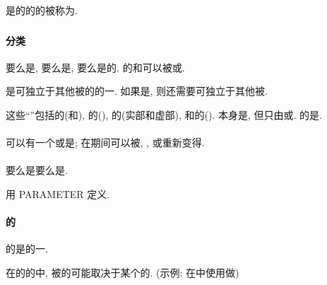 是\Function{}\Reference{}的\Execution{}的\Result{}的\Data{}\Entity{}被称为\Function{}\Result{}.

\subsubsection{\Data{}\Object{}}

\paragraph{\Data{}\Object{}分类}

\Data{}\Object{}要么是\Constant{}, 要么是\Variable{}, 要么是\Constant{}的\Subobject{}. \Named{}\Data{}\Object{}的\Type{}和\TypeParameter{}可以被\Explicitly{}或\Implicitly{}\Specify{}.

\Subobject{}是可独立于其他\Portion{}被\Reference{}的\Data{}\Object{}的一\Portion{}. 如果\Subobject{}是\Variable{}, 则还需要可独立于其他\Portion{}被\Define{}.

这些``\Portion{}''包括\Array{}的\Portion{}(\ArrayElement{}和\ArraySection{}), \CharacterString{}的\Portion{}(\Substring{}), \ComplexType{}\Object{}的\Portion{}(实部和虚部), 和\Structure{}的\Portion{}(\Component{}). \Subobject{}本身是\Data{}\Object{}, 但\Subobject{}只由\ObjectDesignator{}或\Intrinsic{}\Function{}\Reference{}. \Variable{}的\Subobject{}是\Variable{}.

\paragraph{\Variable{}}

\Variable{}可以有一个\Value{}或是\Undefined{}\Variable{}; 在\Program{}\Execution{}期间可以被\Define{}, \Redefine{}, 或重新变得\Undefined{}.

\paragraph{\Constant{}}

\Constant{}要么是\Named{}\Constant{}要么是\Literal{}\Constant{}.

\Named{}\Constant{}用 PARAMETER \Attribute{}定义.

\paragraph{\Constant{}的\Subobject{}}

\Constant{}的\Subobject{}是\Constant{}的一\Portion{}.

在\Constant{}的\Subobject{}的\ObjectDesignator{}中, 被\Reference{}的\Portion{}可能取决于某个\Variable{}的\Value{}. (示例: 在\ArraySection{}中使用\IntegerType{}\Variable{}做\Index{})

